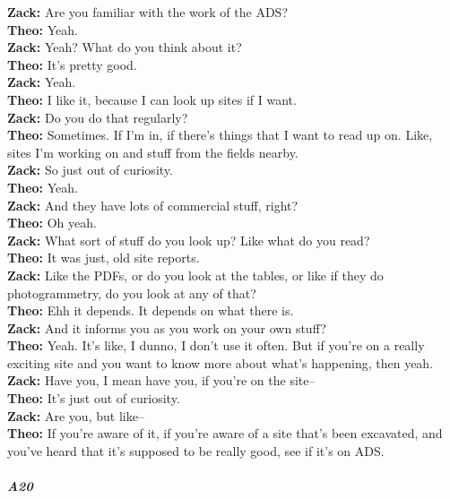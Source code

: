 \documentclass[
]{article}
\begin{document}
\textbf{Zack:} Are you familiar with the work of the ADS?\\
\textbf{Theo:} Yeah.\\
\textbf{Zack:} Yeah? What do you think about it?\\
\textbf{Theo:} It's pretty good.\\
\textbf{Zack:} Yeah.\\
\textbf{Theo:} I like it, because I can look up sites if I want.\\
\textbf{Zack:} Do you do that regularly?\\
\textbf{Theo:} Sometimes. If I'm in, if there's things that I want to
read up on. Like, sites I'm working on and stuff from the fields
nearby.\\
\textbf{Zack:} So just out of curiosity.\\
\textbf{Theo:} Yeah.\\
\textbf{Zack:} And they have lots of commercial stuff, right?\\
\textbf{Theo:} Oh yeah.\\
\textbf{Zack:} What sort of stuff do you look up? Like what do you
read?\\
\textbf{Theo:} It was just, old site reports.\\
\textbf{Zack:} Like the PDFs, or do you look at the tables, or like if
they do photogrammetry, do you look at any of that?\\
\textbf{Theo:} Ehh it depends. It depends on what there is.\\
\textbf{Zack:} And it informs you as you work on your own stuff?\\
\textbf{Theo:} Yeah. It's like, I dunno, I don't use it often. But if
you're on a really exciting site and you want to know more about what's
happening, then yeah.\\
\textbf{Zack:} Have you, I mean have you, if you're on the site--\\
\textbf{Theo:} It's just out of curiosity.\\
\textbf{Zack:} Are you, but like--\\
\textbf{Theo:} If you're aware of it, if you're aware of a site that's
been excavated, and you've heard that it's supposed to be really good,
see if it's on ADS.

\subparagraph{A20}\label{sec-A20}
\end{document}
